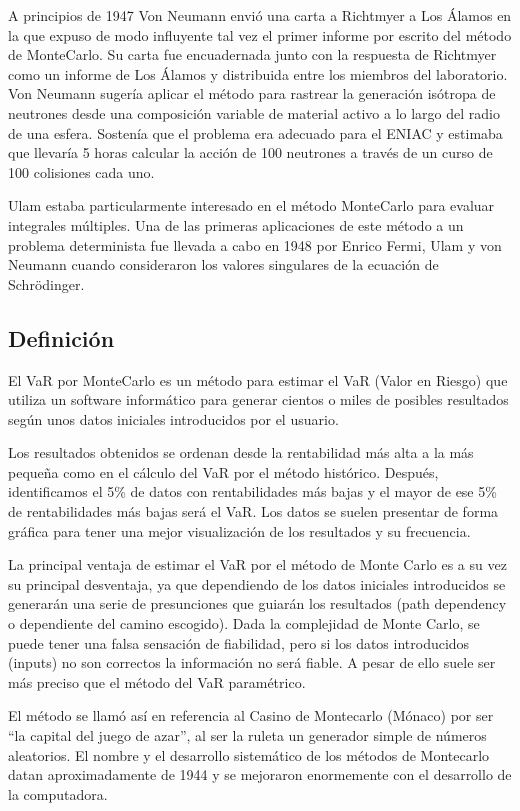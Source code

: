 \documentclass[
  12pt,
]{krantz}
\begin{document}
A principios de 1947 Von Neumann envió una carta a Richtmyer a Los Álamos en la que expuso de modo influyente tal vez el primer informe por escrito del método de MonteCarlo. Su carta fue encuadernada junto con la respuesta de Richtmyer como un informe de Los Álamos y distribuida entre los miembros del laboratorio. Von Neumann sugería aplicar el método para rastrear la generación isótropa de neutrones desde una composición variable de material activo a lo largo del radio de una esfera. Sostenía que el problema era adecuado para el ENIAC y estimaba que llevaría 5 horas calcular la acción de 100 neutrones a través de un curso de 100 colisiones cada uno.

Ulam estaba particularmente interesado en el método MonteCarlo para evaluar integrales múltiples. Una de las primeras aplicaciones de este método a un problema determinista fue llevada a cabo en 1948 por Enrico Fermi, Ulam y von Neumann cuando consideraron los valores singulares de la ecuación de Schrödinger.

\hypertarget{definicion}{%
\subsection{Definición}\label{definicion}}

El VaR por MonteCarlo es un método para estimar el VaR (Valor en Riesgo) que utiliza un software informático para generar cientos o miles de posibles resultados según unos datos iniciales introducidos por el usuario.

Los resultados obtenidos se ordenan desde la rentabilidad más alta a la más pequeña como en el cálculo del VaR por el método histórico. Después, identificamos el 5\% de datos con rentabilidades más bajas y el mayor de ese 5\% de rentabilidades más bajas será el VaR. Los datos se suelen presentar de forma gráfica para tener una mejor visualización de los resultados y su frecuencia.

La principal ventaja de estimar el VaR por el método de Monte Carlo es a su vez su principal desventaja, ya que dependiendo de los datos iniciales introducidos se generarán una serie de presunciones que guiarán los resultados (path dependency o dependiente del camino escogido). Dada la complejidad de Monte Carlo, se puede tener una falsa sensación de fiabilidad, pero si los datos introducidos (inputs) no son correctos la información no será fiable. A pesar de ello suele ser más preciso que el método del VaR paramétrico.

El método se llamó así en referencia al Casino de Montecarlo (Mónaco) por ser ``la capital del juego de azar'', al ser la ruleta un generador simple de números aleatorios. El nombre y el desarrollo sistemático de los métodos de Montecarlo datan aproximadamente de 1944 y se mejoraron enormemente con el desarrollo de la computadora.
\end{document}
